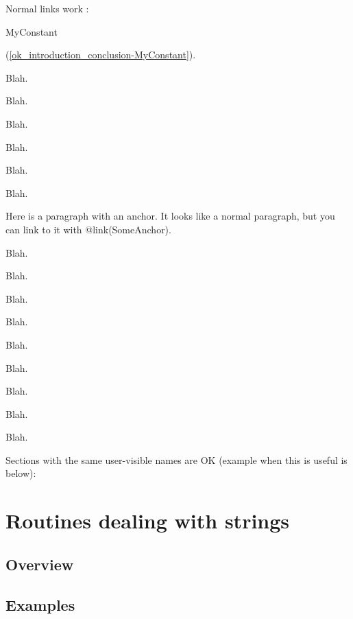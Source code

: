 \documentclass{report}
\newif\ifpdf
\begin{document}
Normal links work : \begin{ttfamily}MyConstant\end{ttfamily}(\ref{ok_introduction_conclusion-MyConstant}).

Blah.

Blah.

Blah.

Blah.

Blah.

Blah.

\label{SomeAnchor}
 Here is a paragraph with an anchor. It looks like a normal paragraph, but you can link to it with @link(SomeAnchor).

Blah.

Blah.

Blah.

Blah.

Blah.

Blah.

Blah.

Blah.

Blah.

Sections with the same user{-}visible names are OK (example when this is useful is below):

\label{SecStrings}
\section{Routines dealing with strings}


\label{SecStringsOverview}
\ifpdf
\subsection*{\large{\textbf{Overview}}\normalsize\hspace{1ex}\hrulefill}\else
\subsection*{Overview}
\fi


\label{SecStringsExamples}
\ifpdf
\subsection*{\large{\textbf{Examples}}\normalsize\hspace{1ex}\hrulefill}\else
\subsection*{Examples}
\fi


\label{SecIntegers}
\end{document}
